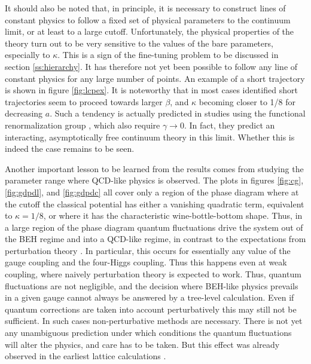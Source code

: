 \documentclass[final,12pt,3p,longtitle]{elsarticle}
\newcommand*{\1}{1\!\!\!\bot}
\begin{document}
It should also be noted that, in principle, it is necessary to construct lines of constant physics \cite{Montvay:1994cy,Gattringer:2010zz,DeGrand:2006zz} to follow a fixed set of physical parameters to the continuum limit, or at least to a large cutoff. Unfortunately, the physical properties of the theory turn out to be very sensitive to the values of the bare parameters, especially to $\kappa$. This is a sign of the fine-tuning problem to be discussed in section \ref{ss:hierarchy}. It has therefore not yet been possible to follow any line of constant physics for any large number of points. An example of a short trajectory is shown in figure \ref{fig:lcpex}. It is noteworthy that in most cases identified short trajectories seem to proceed towards larger $\beta$, and $\kappa$ becoming closer to 1/8 for decreasing $a$. Such a tendency is actually predicted in studies using the functional renormalization group \cite{Gies:2015lia,Gies:2016kkk}, which also require $\gamma\to 0$. In fact, they predict an interacting, asymptotically free continuum theory in this limit. Whether this is indeed the case remains to be seen.

Another important lesson to be learned from the results comes from studying the parameter range where QCD-like physics is observed. The plots in figures \ref{fig:cg}, \ref{fig:gdpdl}, and \ref{fig:gdpdc} all cover only a region of the phase diagram where at the cutoff the classical potential has either a vanishing quadratic term, equivalent to $\kappa=1/8$, or where it has the characteristic wine-bottle-bottom shape. Thus, in a large region of the phase diagram quantum fluctuations drive the system out of the BEH regime and into a QCD-like regime, in contrast to the expectations from perturbation theory \cite{Bohm:2001yx,Kapusta:2006pm}. In particular, this occurs for essentially any value of the gauge coupling and the four-Higgs coupling. Thus this happens even at weak coupling, where naively perturbation theory is expected to work. Thus, quantum fluctuations are not negligible, and the decision where BEH-like physics prevails in a given gauge cannot always be answered by a tree-level calculation. Even if quantum corrections are taken into account perturbatively \cite{Coleman:1973jx,Kapusta:2006pm} this may still not be sufficient. In such cases non-perturbative methods are necessary. There is not yet any unambiguous prediction under which conditions the quantum fluctuations will alter the physics, and care has to be taken. But this effect was already observed in the earliest lattice calculations \cite{Evertz:1985fc,Langguth:1985eu,Langguth:1985dr}.
\end{document}
